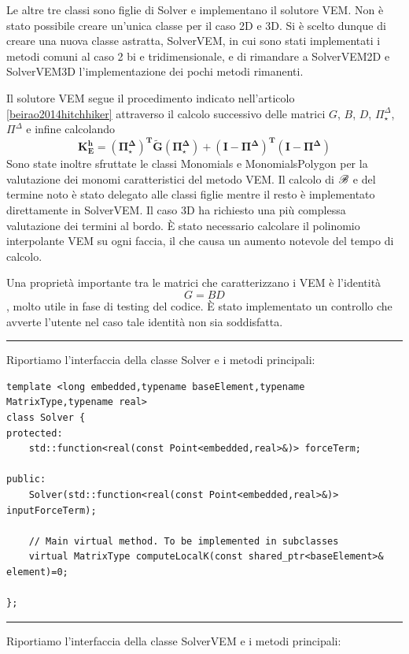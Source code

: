 \documentclass[oneside,12pt]{book}  %
\theoremstyle{plain}
\theoremstyle{definition}
\theoremstyle{remark}
\numberwithin{equation}{chapter} %
\begin{document}
Le altre tre classi sono figlie di Solver e implementano il solutore
VEM. Non \`e stato possibile creare un'unica classe per il caso 2D e
3D. Si \`e scelto dunque di creare una nuova classe astratta,
SolverVEM, in cui sono stati implementati i metodi comuni al caso 2 bi
e tridimensionale, e di rimandare a SolverVEM2D e SolverVEM3D
l'implementazione dei pochi metodi rimanenti. 

Il solutore VEM segue il procedimento indicato nell'articolo
\ref{beirao2014hitchhiker} attraverso il calcolo successivo delle
matrici $G$, $B$, $D$, $\Pi^\Delta_\star$, $\Pi^\Delta$ e infine
calcolando $$ \mathbf{K_E^h= (\Pi^\Delta_\star)^T \tilde{G}
  (\Pi^\Delta_\star)+(I-\Pi^\Delta)^T (I-\Pi^\Delta)} $$ 
Sono state inoltre sfruttate le classi Monomials e MonomialsPolygon
per la valutazione dei monomi caratteristici del metodo VEM. 
Il calcolo di $\mathscr{B}$ e del termine noto \`e stato delegato alle classi
figlie mentre il resto \`e implementato direttamente in SolverVEM. Il
caso 3D ha richiesto una pi\`u complessa valutazione dei termini al
bordo. \`E stato necessario calcolare il polinomio interpolante VEM su
ogni faccia, il che causa un aumento notevole del tempo di calcolo.

Una propriet\`a importante tra le matrici che caratterizzano i VEM \`e
l'identit\`a $$G=BD$$, molto utile in fase di testing del codice. \`E
stato implementato un controllo che avverte l'utente nel caso tale
identit\`a non sia soddisfatta.

\noindent\rule{14cm}{1pt}

Riportiamo l'interfaccia della classe Solver e i metodi principali:

\begin{verbatim}
template <long embedded,typename baseElement,typename MatrixType,typename real>
class Solver {
protected:
    std::function<real(const Point<embedded,real>&)> forceTerm;
	
public:
    Solver(std::function<real(const Point<embedded,real>&)> inputForceTerm);

    // Main virtual method. To be implemented in subclasses
    virtual MatrixType computeLocalK(const shared_ptr<baseElement>& element)=0;
	
};

\end{verbatim}

\noindent\rule{14cm}{1pt}

Riportiamo l'interfaccia della classe SolverVEM e i metodi principali:
\end{document}

